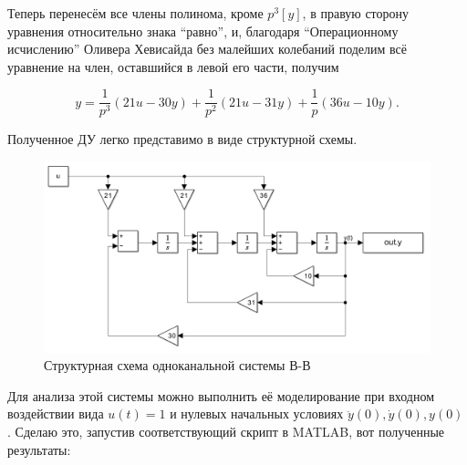 \documentclass[a4paper]{article}
\begin{document}
Теперь перенесём все члены полинома, кроме $p^3[y]$, в правую сторону уравнения относительно знака ``равно'', и, благодаря ``Операционному исчислению'' Оливера Хевисайда без малейших колебаний поделим всё уравнение на член, оставшийся в левой его части, получим

$$
y = \frac{1}{p^3}(21u-30y)+\frac{1}{p^2}(21u-31y)+\frac{1}{p}(36u-10y).
$$

Полученное ДУ легко представимо в виде структурной схемы.\

\begin{figure}[H]
    \centering
    \includegraphics[width=0.75\linewidth]{ex1/structure_scheme.png}
    \caption{Структурная схема одноканальной системы В-В}
\end{figure}

Для анализа этой системы можно выполнить её моделирование при входном воздействии вида $u(t) = 1$ и нулевых начальных условиях $\ddot{y}(0), \dot{y}(0), y(0)$. Сделаю это, запустив соответствующий скрипт в MATLAB, вот полученные результаты:
\end{document}
